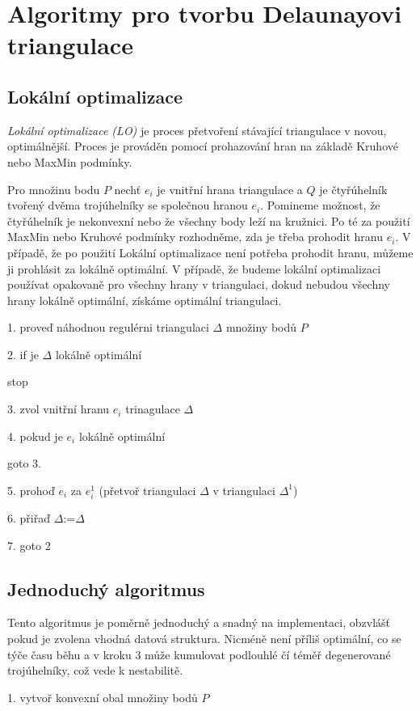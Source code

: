 \documentclass[12pt,a4paper]{article}
\begin{document}
\newpage
\section{Algoritmy pro tvorbu Delaunayovi triangulace}
\subsection{Lokální optimalizace}
\textit{Lokální optimalizace (LO)} je proces přetvoření stávající triangulace v novou, optimálnější. Proces je prováděn pomocí prohazování hran na základě Kruhové nebo MaxMin podmínky. 

Pro množinu bodu $P$ nechť $e_i$ je vnitřní hrana triangulace a $Q$ je čtyřúhelník tvořený dvěma trojúhelníky se společnou hranou $e_i$. Pomineme možnost, že čtyřúhelník je nekonvexní nebo že všechny body leží na kružnici. Po té za použití MaxMin nebo Kruhové podmínky rozhodněme, zda je třeba prohodit hranu $e_i$. V případě, že po použití Lokální optimalizace není potřeba prohodit hranu, můžeme ji prohlásit za lokálně optimální. V případě, že  budeme lokální optimalizaci používat opakovaně pro všechny hrany v triangulaci, dokud nebudou všechny hrany lokálně optimální, získáme optimální triangulaci.


1. proveď náhodnou regulérni triangulaci $\Delta$ množiny bodů $P$

2. if je $\Delta$ lokálně optimální

	stop
	
3. zvol vnitřní hranu $e_i$ trinagulace $\Delta$

4. pokud je $e_i$ lokálně optimální

	goto 3.
	
5. prohoď $e_i$ za $e_i^1$ (přetvoř triangulaci $\Delta$ v triangulaci $\Delta^1$)

6. přiřaď $\Delta$:=$\Delta$

7. goto 2


\subsection{Jednoduchý algoritmus}
Tento algoritmus je poměrně jednoduchý a snadný na implementaci, obzvlášť pokud je zvolena vhodná datová struktura. Nicméně není příliš optimální, co se týče času běhu a v kroku 3 může kumulovat podlouhlé čí téměř degenerované trojúhelníky, což vede k nestabilitě. 

1. vytvoř konvexní obal množiny bodů $P$
\end{document}
